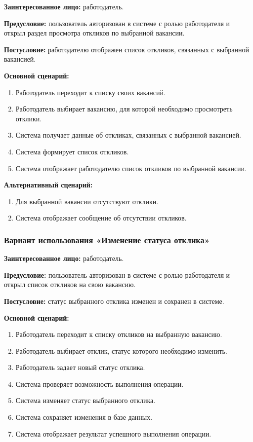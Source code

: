 \textbf{Заинтересованное лицо:} работодатель.

\textbf{Предусловие:} пользователь авторизован в системе с ролью работодателя и открыл раздел просмотра откликов по выбранной вакансии.

\textbf{Постусловие:} работодателю отображен список откликов, связанных с выбранной вакансией.

\textbf{Основной сценарий:}
\begin{enumerate}
	\item Работодатель переходит к списку своих вакансий.
	\item Работодатель выбирает вакансию, для которой необходимо просмотреть отклики.
	\item Система получает данные об откликах, связанных с выбранной вакансией.
	\item Система формирует список откликов.
	\item Система отображает работодателю список откликов по выбранной вакансии.
\end{enumerate}

\textbf{Альтернативный сценарий:}
\begin{enumerate}
	\item Для выбранной вакансии отсутствуют отклики.
	\item Система отображает сообщение об отсутствии откликов.
\end{enumerate}

\subsubsection{Вариант использования «Изменение статуса отклика»}

\textbf{Заинтересованное лицо:} работодатель.

\textbf{Предусловие:} пользователь авторизован в системе с ролью работодателя и открыл список откликов на свою вакансию.

\textbf{Постусловие:} статус выбранного отклика изменен и сохранен в системе.

\textbf{Основной сценарий:}
\begin{enumerate}
	\item Работодатель переходит к списку откликов на выбранную вакансию.
	\item Работодатель выбирает отклик, статус которого необходимо изменить.
	\item Работодатель задает новый статус отклика.
	\item Система проверяет возможность выполнения операции.
	\item Система изменяет статус выбранного отклика.
	\item Система сохраняет изменения в базе данных.
	\item Система отображает результат успешного выполнения операции.
\end{enumerate}

